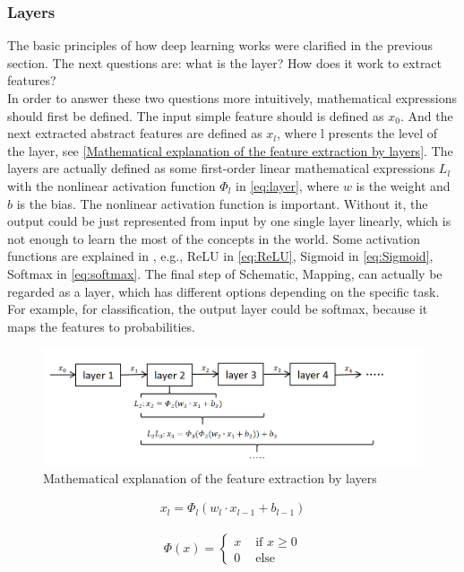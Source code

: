   \subsubsection{Layers}
  The basic principles of how deep learning works were clarified in the previous section. The next questions are: what is the layer? How does it work to extract features?\\
  In order to answer these two questions more intuitively, mathematical expressions should first be defined. The input simple feature should is defined as $x_{0}$. 
  And the next extracted abstract features are defined as $x_{l}$, where l presents the level of the layer, see \autoref{Mathematical explanation of the feature extraction by layers}.
  The layers are actually defined as some first-order linear mathematical expressions $L _{l}$ with the nonlinear activation function $\Phi_{l}$ in \autoref{eq:layer}, 
  where $w$ is the weight and $b$ is the bias. The nonlinear activation function is important. Without it, the output could be just represented from input by one single layer linearly,
  which is not enough to learn the most of the concepts in the world. Some activation functions are explained in \cite{0706bf17a845490688ef4d7d19df65ba}, e.g., ReLU in \autoref{eq:ReLU}, 
  Sigmoid in \autoref{eq:Sigmoid}, Softmax in \autoref{eq:softmax}. The final step of Schematic, Mapping, can actually be regarded as a layer, which has different options depending on 
  the specific task. For example, for classification, the output layer could be softmax, because it maps the features to probabilities. 
  \begin{figure}
    \centering
    \includegraphics[width=0.9\linewidth]{example_images/mathLayers}
    \caption{Mathematical explanation of the feature extraction by layers}
    \label{Mathematical explanation of the feature extraction by layers}
  \end{figure}
  \begin{align}
    x_{l}=\Phi _{l}(w_{l} \cdot x_{l-1}+ b_{l-1})
     \label{eq:layer}
  \end{align}

  \begin{align}
    \Phi(x) = \begin{cases}
      x& \text{ if } x\ge 0 \\
      0& \text{ else } 
    \end{cases}
     \label{eq:ReLU}
  \end{align}


